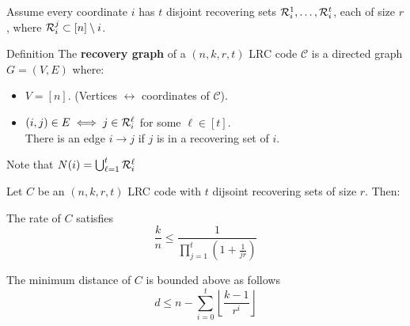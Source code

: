 \begin{frame}
        Assume every coordinate $i$ has $t$ disjoint recovering sets $\mathcal{R}_i^1, \dots, \mathcal{R}_i^t$, each of size $r$, where $\mathcal{R}_i^j \subset \left[n \right] \setminus i$.
        \begin{block}{Definition}
            The \textbf{recovery graph} of a $(n,k,r,t)$ LRC code $\mathcal{C}$ is a directed graph $G=(V,E)$ where:
            \begin{itemize}
                \item $V = \left[n \right]$. (Vertices $\leftrightarrow$ coordinates of $\mathcal{C}$).
                \item $(i,j) \in E \iff j \in \mathcal{R}_i^\ell$ for some $\ell \in \left[ t \right]$.\\
                There is an edge $i \rightarrow j$ if $j$ is in a recovering set of $i$.\\
            \end{itemize}    
                Note that $N(i) = \bigcup_{\ell = 1}^{t} \mathcal{R}_i^\ell$
        \end{block}
    \end{frame}    
    
\begin{frame}
    Let $C$ be an $(n,k,r,t)$ LRC code with $t$ dijsoint recovering sets of size $r$. Then:
    \begin{thm}
        \label{thm:max_rate_t}
        The rate of $C$ satisfies
        $$ \frac{k}{n} \leq \frac{1}{\prod_{j=1}^{t} (1 + \frac{1}{jr} )} $$
    \end{thm}
    
    \begin{thm}
        \label{thm:min_dist_t}
        The minimum distance of $C$ is bounded above as follows
        $$ d \leq n - \sum_{i=0}^{t} \left\lfloor \frac{k-1}{r^i} \right\rfloor $$
    \end{thm}
\end{frame}    
    
    
    

